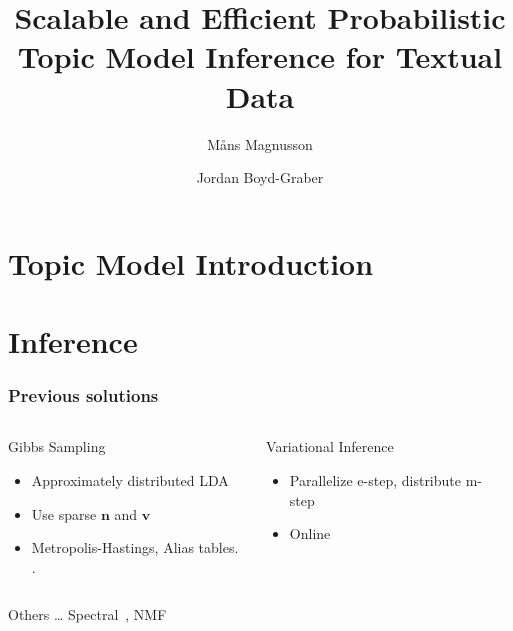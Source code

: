 \documentclass[compress]{beamer}
\title[]{Scalable and Efficient Probabilistic Topic Model Inference
  for Textual Data}
\author{M\r{a}ns Magnusson}
\date{Jordan Boyd-Graber}
\institute[UMD] %
{Linköpings universitet}
\begin{document}
\frame{
\titlepage
\tiny
}


\section{Topic Model Introduction}






\section{Inference}




\begin{frame}
\frametitle{Previous solutions}

\begin{columns}


\begin{block}{\alert<2>{Gibbs Sampling}}

\begin{itemize}
\item Approximately distributed LDA~\cite{newman2009distributed} \\
\item Use sparse $\mathbf{n}$ and $\mathbf{v}$ \cite{yao2009efficient}
\item Metropolis-Hastings, Alias tables. \cite{yuan2015lightlda}.
\end{itemize}

\end{block}


\begin{block}{Variational Inference}

\begin{itemize}
  \item Parallelize e-step, distribute m-step~\cite{zhai-12}
  \item Online~\cite{hoffman-10}
\end{itemize}

\end{block}

\end{columns}

\begin{block}{Others \dots}
  Spectral~\cite{Nguyen:Hu:Boyd-Graber-2014}, NMF
\end{block}


\end{frame}
\end{document}
